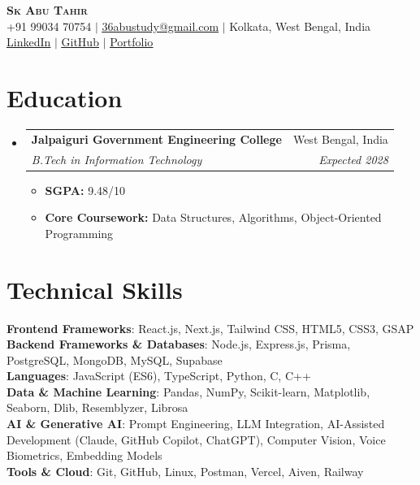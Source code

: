\documentclass[letterpaper,11pt]{article}
\makeatletter
\newcommand{\resumeItem}[1]{
    \item\small{#1 \vspace{-2pt}}
  }
\newcommand{\resumeSubheading}[4]{
    \vspace{-2pt}\item
      \begin{tabular*}{0.97\textwidth}[t]{l@{\extracolsep{\fill}}r}
        \textbf{#1} & #2 \\
        \textit{\small#3} & \textit{\small #4} \\
      \end{tabular*}\vspace{-7pt}
  }
\newcommand{\resumeSubHeadingListStart}{\begin{itemize}[leftmargin=0.15in, label={}]}
\newcommand{\resumeSubHeadingListEnd}{\end{itemize}}
\newcommand{\resumeItemListStart}{\begin{itemize}[itemsep=0pt, parsep=0pt, topsep=2pt]}
\newcommand{\resumeItemListEnd}{\end{itemize}\vspace{-5pt}}
\makeatother
\begin{document}
  \begin{center}
      \textbf{\Huge \scshape Sk Abu Tahir} \\ \vspace{4pt}
      \small +91 99034 70754 $|$
      \href{mailto:36abustudy@gmail.com}{\underline{36abustudy@gmail.com}} $|$
      Kolkata, West Bengal, India \\ \vspace{2pt}
      \href{https://www.linkedin.com/in/sk-abu-tahir-/}{\underline{LinkedIn}} $|$
      \href{https://github.com/SkAbuTahir}{\underline{GitHub}} $|$
      \href{https://skabutahirportfolio.vercel.app/}{\underline{Portfolio}}
  \end{center}

  \section{Education}
    \resumeSubHeadingListStart
      \resumeSubheading
        {Jalpaiguri Government Engineering College}{West Bengal, India}
        {B.Tech in Information Technology}{Expected 2028}
      \resumeItemListStart
        \resumeItem{\textbf{SGPA:} 9.48/10}
        \resumeItem{\textbf{Core Coursework:} Data Structures, Algorithms, Object-Oriented Programming}
      \resumeItemListEnd
    \resumeSubHeadingListEnd

  \section{Technical Skills}
  \begin{itemize}[leftmargin=0.15in, label={}]
      \small{\item{
      \textbf{Frontend Frameworks}{: React.js, Next.js, Tailwind CSS, HTML5, CSS3, GSAP} \\[2pt]
      \textbf{Backend Frameworks \& Databases}{: Node.js, Express.js, Prisma, PostgreSQL, MongoDB, MySQL, Supabase} \\[2pt]
      \textbf{Languages}{: JavaScript (ES6), TypeScript, Python, C, C++} \\[2pt]
      \textbf{Data \& Machine Learning}{: Pandas, NumPy, Scikit-learn, Matplotlib, Seaborn, Dlib, Resemblyzer, Librosa} \\[2pt]
      \textbf{AI \& Generative AI}{: Prompt Engineering, LLM Integration, AI-Assisted Development (Claude, GitHub Copilot, ChatGPT), Computer Vision, Voice Biometrics, Embedding Models} \\[2pt]
      \textbf{Tools \& Cloud}{: Git, GitHub, Linux, Postman, Vercel, Aiven, Railway}
      }}
  \end{itemize}
\end{document}
